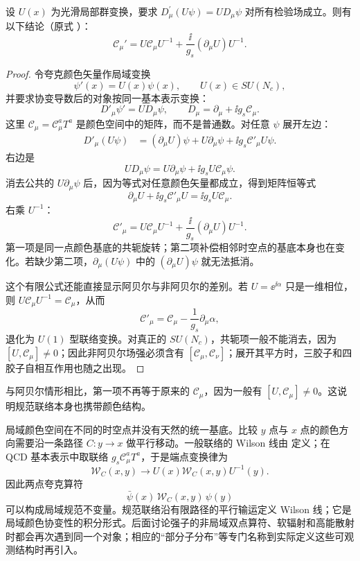 \begin{proposition}[协变导数固定联络变换]
设 $U(x)$ 为光滑局部群变换，要求 $D_\mu^\prime(U\psi)=UD_\mu\psi$ 对所有检验场成立。则有以下结论（原式 ）：
\begin{equation*}
 \boxed{
 \mathscr C_\mu'
 =U\mathscr C_\mu U^{-1}
 +\frac{\ii}{g_s}(\partial_\mu U)U^{-1}.}
\end{equation*}
\end{proposition}
\begin{proof}
令夸克颜色矢量作局域变换
\[
\psi'(x)=U(x)\psi(x),
\qquad U(x)\in SU(N_c),
\]
并要求协变导数后的对象按同一基本表示变换：
\[
D'_\mu\psi'=U D_\mu\psi,
\qquad
D_\mu=\partial_\mu+\ii g_s\mathscr C_\mu.
\]
这里 $\mathscr C_\mu=\mathscr C_\mu^aT^a$ 是颜色空间中的矩阵，而不是普通数。对任意 $\psi$ 展开左边：
\begin{align*}
D'_\mu(U\psi)
&=(\partial_\mu U)\psi
+U\partial_\mu\psi
+\ii g_s\mathscr C'_\mu U\psi.
\end{align*}
右边是
\[
UD_\mu\psi
=U\partial_\mu\psi+\ii g_sU\mathscr C_\mu\psi.
\]
消去公共的 $U\partial_\mu\psi$ 后，因为等式对任意颜色矢量都成立，得到矩阵恒等式
\[
\partial_\mu U+\ii g_s\mathscr C'_\mu U
=\ii g_sU\mathscr C_\mu.
\]
右乘 $U^{-1}$：
\[
\boxed{
\mathscr C'_\mu
=U\mathscr C_\mu U^{-1}
+\frac{\ii}{g_s}(\partial_\mu U)U^{-1}.}
\]
第一项是同一点颜色基底的共轭旋转；第二项补偿相邻时空点的基底本身也在变化。若缺少第二项，$\partial_\mu(U\psi)$ 中的 $(\partial_\mu U)\psi$ 就无法抵消。

这个有限公式还能直接显示阿贝尔与非阿贝尔的差别。若 $U=\ee^{\ii\alpha}$ 只是一维相位，则 $U\mathscr C_\mu U^{-1}=\mathscr C_\mu$，从而
\[
\mathscr C'_\mu
=\mathscr C_\mu-\frac1{g_s}\partial_\mu\alpha,
\]
退化为 $U(1)$ 型联络变换。对真正的 $SU(N_c)$，共轭项一般不能消去，因为 $[U,\mathscr C_\mu]\neq0$；因此非阿贝尔场强必须含有 $[\mathscr C_\mu,\mathscr C_\nu]$；展开其平方时，三胶子和四胶子自相互作用也随之出现。
\end{proof}

与阿贝尔情形相比，第一项不再等于原来的 $\mathscr C_\mu$，因为一般有 $[U,\mathscr C_\mu]\neq0$。这说明规范联络本身也携带颜色结构。

局域颜色空间在不同的时空点并没有天然的统一基底。比较 $y$ 点与 $x$ 点的颜色方向需要沿一条路径 $C:y\to x$ 做平行移动。一般联络的 Wilson 线由 定义；在 QCD 基本表示中取联络 $g_s\mathscr C_\mu^aT^a$，于是端点变换律为
\begin{equation*}
 \mathcal W_C(x,y)\longrightarrow
 U(x)\mathcal W_C(x,y)U^{-1}(y).
\end{equation*}
因此两点夸克算符
\begin{equation*}
 \bar\psi(x)\,\mathcal W_C(x,y)\,\psi(y)
\end{equation*}
可以构成局域规范不变量。规范联络沿有限路径的平行输运定义 Wilson 线；它是局域颜色协变性的积分形式。后面讨论强子的非局域双点算符、软辐射和高能散射时都会再次遇到同一个对象；相应的“部分子分布”等专门名称到实际定义这些可观测结构时再引入。

